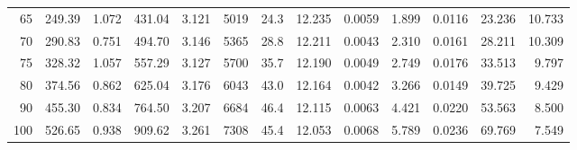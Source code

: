 \documentclass[10pt]{article}
\begin{document}
{\begin{tabular}{|r|rr|rr|rr|rr|rr|r|r|}
       65 &       249.39 &        1.072 &       431.04 &        3.121 &         5019 &         24.3 &       12.235 &       0.0059 &        1.899 &       0.0116 &       23.236 &       10.733 \\
       70 &       290.83 &        0.751 &       494.70 &        3.146 &         5365 &         28.8 &       12.211 &       0.0043 &        2.310 &       0.0161 &       28.211 &       10.309 \\
       75 &       328.32 &        1.057 &       557.29 &        3.127 &         5700 &         35.7 &       12.190 &       0.0049 &        2.749 &       0.0176 &       33.513 &        9.797 \\
       80 &       374.56 &        0.862 &       625.04 &        3.176 &         6043 &         43.0 &       12.164 &       0.0042 &        3.266 &       0.0149 &       39.725 &        9.429 \\
       90 &       455.30 &        0.834 &       764.50 &        3.207 &         6684 &         46.4 &       12.115 &       0.0063 &        4.421 &       0.0220 &       53.563 &        8.500 \\
      100 &       526.65 &        0.938 &       909.62 &        3.261 &         7308 &         45.4 &       12.053 &       0.0068 &        5.789 &       0.0236 &       69.769 &        7.549 \\
\hline
\end{tabular}
}







\pagebreak
\end{document}
